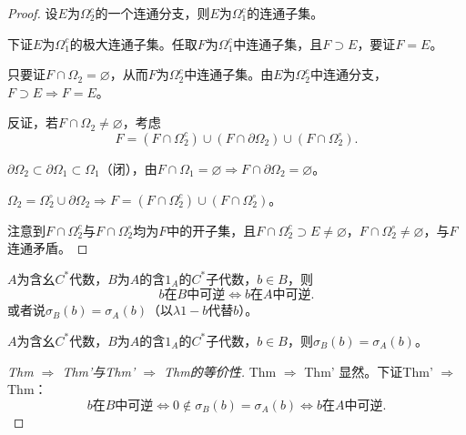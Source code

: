 \documentclass[lang=cn,a4paper,newtx,section]{elegantbook}
\begin{document}
\begin{proof}
  设$E$为$\Omega_2^c$的一个连通分支，则$E$为$\Omega_1^c$的连通子集。
  
  下证$E$为$\Omega_1^c$的极大连通子集。任取$F$为$\Omega_1^c$中连通子集，且$F \supset E$，要证$F = E$。
  
  只要证$F \cap \Omega_2 = \varnothing$，从而$F$为$\Omega_2^c$中连通子集。由$E$为$\Omega_2^c$中连通分支，$F \supset E \Rightarrow F = E$。
  
  反证，若$F \cap \Omega_2 \neq \varnothing$，考虑
  \begin{equation*}
    F = (F \cap \Omega_2^c) \cup (F \cap \partial\Omega_2) \cup (F \cap \Omega_2^\circ).
  \end{equation*}
  
  $\partial\Omega_2 \subset \partial\Omega_1 \subset \Omega_1$（闭），由$F \cap \Omega_1 = \varnothing \Rightarrow F \cap \partial\Omega_2 = \varnothing$。
  
  $\Omega_2 = \Omega_2^\circ \cup \partial\Omega_2 \Rightarrow F = (F \cap \Omega_2^c) \cup (F \cap \Omega_2^\circ)$。
  
  注意到$F \cap \Omega_2^c$与$F \cap \Omega_2^\circ$均为$F$中的开子集，且$F \cap \Omega_2^c \supset E \neq \varnothing$，$F \cap \Omega_2^\circ \neq \varnothing$，与$F$连通矛盾。
\end{proof}

\begin{theorem}
  $A$为含幺$C^*$代数，$B$为$A$的含$1_A$的$C^*$子代数，$b \in B$，则
  \begin{equation*}
    b\text{在}B\text{中可逆} \Longleftrightarrow b\text{在}A\text{中可逆}.
  \end{equation*}
  或者说$\sigma_B(b) = \sigma_A(b)$（以$\lambda 1 - b$代替$b$）。
\end{theorem}

\begin{theorem}[等价形式]
  $A$为含幺$C^*$代数，$B$为$A$的含$1_A$的$C^*$子代数，$b \in B$，则$\sigma_B(b) = \sigma_A(b)$。
\end{theorem}

\begin{proof}[Thm $\Rightarrow$ Thm'与Thm' $\Rightarrow$ Thm的等价性]
  Thm $\Rightarrow$ Thm' 显然。下证Thm' $\Rightarrow$ Thm：
  \begin{equation*}
    b\text{在}B\text{中可逆} \Longleftrightarrow 0 \notin \sigma_B(b) = \sigma_A(b) \Longleftrightarrow b\text{在}A\text{中可逆}.
  \end{equation*}
\end{proof}
\end{document}

